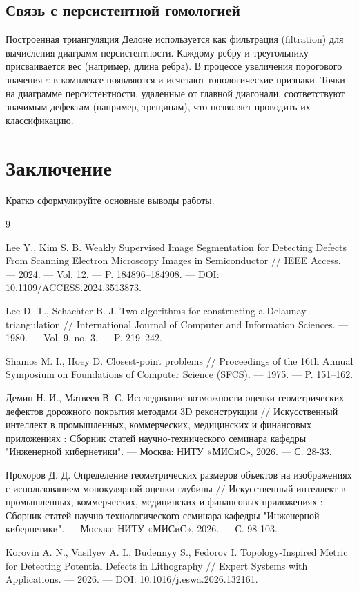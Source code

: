\documentclass{misisarticle}
\begin{document}
\subsection{Связь с персистентной гомологией}

Построенная триангуляция Делоне используется как фильтрация (filtration) для вычисления диаграмм персистентности. Каждому ребру 
и треугольнику присваивается вес (например, длина ребра). В процессе увеличения порогового значения \(\varepsilon\) в комплексе 
появляются и исчезают топологические признаки. Точки на диаграмме персистентности, удаленные от главной диагонали, соответствуют 
значимым дефектам (например, трещинам), что позволяет проводить их классификацию.


\section{Заключение}

Кратко сформулируйте основные выводы работы.

\begin{thebibliography}{9}

Lee Y., Kim S. B. Weakly Supervised Image Segmentation for Detecting Defects From Scanning Electron Microscopy Images in Semiconductor // IEEE Access. — 2024. — Vol. 12. — P. 184896–184908. — DOI: 10.1109/ACCESS.2024.3513873.

Lee D. T., Schachter B. J. Two algorithms for constructing a Delaunay triangulation // International Journal of Computer and Information Sciences. — 1980. — Vol. 9, no. 3. — P. 219–242.

Shamos M. I., Hoey D. Closest-point problems // Proceedings of the 16th Annual Symposium on Foundations of Computer Science (SFCS). — 1975. — P. 151–162.

Демин Н. И., Матвеев В. С. Исследование возможности оценки геометрических дефектов дорожного покрытия методами 3D реконструкции // Искусственный интеллект в промышленных, коммерческих, медицинских и финансовых приложениях : Сборник статей научно-технического семинара кафедры "Инженерной кибернетики". — Москва: НИТУ «МИСиС», 2026. — С. 28-33.

Прохоров Д. Д. Определение геометрических размеров объектов на изображениях с использованием монокулярной оценки глубины // Искусственный интеллект в промышленных, коммерческих, медицинских и финансовых приложениях : Сборник статей научно-технологического семинара кафедры "Инженерной кибернетики". — Москва: НИТУ «МИСиС», 2026. — С. 98-103.

Korovin A. N., Vasilyev A. I., Budennyy S., Fedorov I. Topology-Inspired Metric for Detecting Potential Defects in Lithography // Expert Systems with Applications. — 2026. — DOI: 10.1016/j.eswa.2026.132161.

\end{thebibliography}
\end{document}
